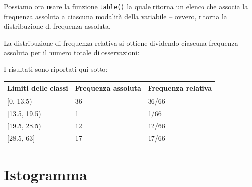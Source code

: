 \documentclass[
  11pt,
  italian,
  a4paper,
  extrafontsizes,onecolumn,openright
  ]{memoir}
\newenvironment{Shaded}{\begin{snugshade}}{\end{snugshade}}
\newcommand{\CommentTok}[1]{\textcolor[rgb]{0.56,0.35,0.01}{\textit{#1}}}
\newcommand{\FunctionTok}[1]{\textcolor[rgb]{0.00,0.00,0.00}{#1}}
\newcommand{\NormalTok}[1]{#1}
\newcommand{\SpecialCharTok}[1]{\textcolor[rgb]{0.00,0.00,0.00}{#1}}
\theoremstyle{definition}
\theoremstyle{definition}
\theoremstyle{definition}
\theoremstyle{definition}
\theoremstyle{remark}
\begin{document}
\noindent
Possiamo ora usare la funzione \texttt{table()} la quale ritorna un elenco che associa la frequenza assoluta a ciascuna modalità della variabile -- ovvero, ritorna la distribuzione di frequenza assoluta.

\begin{Shaded}
\end{Shaded}

\noindent
La distribuzione di frequenza relativa si ottiene dividendo ciascuna frequenza assoluta per il numero totale di osservazioni:

\begin{Shaded}
\end{Shaded}

\noindent
I risultati sono riportati qui sotto:

\begin{longtable}[]{@{}lll@{}}
\toprule
Limiti delle classi & Frequenza assoluta & Frequenza relativa \\
\midrule
\endhead
{[}0, 13.5) & 36 & 36/66 \\
{[}13.5, 19.5) & 1 & 1/66 \\
{[}19.5, 28.5) & 12 & 12/66 \\
{[}28.5, 63{]} & 17 & 17/66 \\
\bottomrule
\end{longtable}

\hypertarget{istogramma}{%
\section{Istogramma}\label{istogramma}}
\end{document}
